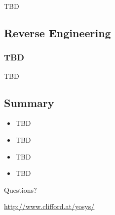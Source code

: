 \begin{frame}{\subsubsecname}
TBD
\end{frame}


\subsection{Reverse Engineering}

\begin{frame}
\subsectionpage
\subsectionpagesuffix
\end{frame}

\subsubsection{TBD}

\begin{frame}{\subsubsecname}
TBD
\end{frame}


\subsection{Summary}

\begin{frame}{\subsecname}
\begin{itemize}
\item TBD
\item TBD
\item TBD
\item TBD
\end{itemize}

\bigskip
\bigskip
\begin{center}
Questions?
\end{center}

\bigskip
\bigskip
\begin{center}
\url{http://www.clifford.at/yosys/}
\end{center}
\end{frame}

